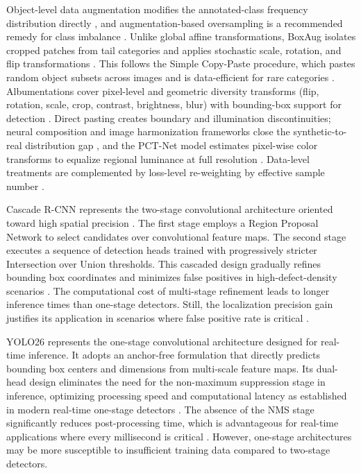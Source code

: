 \documentclass[pdflatex,sn-basic,Numbered,iicol]{sn-jnl}
\begin{document}
Object-level data augmentation modifies the annotated-class frequency distribution directly \citep{LEE2022104138}, and augmentation-based oversampling is a recommended remedy for class imbalance \citep{shorten2019augmentation}. Unlike global affine transformations, BoxAug isolates cropped patches from tail categories and applies stochastic scale, rotation, and flip transformations \citep{LEE2022104138}. This follows the Simple Copy-Paste procedure, which pastes random object subsets across images and is data-efficient for rare categories \citep{ghiasi2021simple}. Albumentations cover pixel-level and geometric diversity transforms (flip, rotation, scale, crop, contrast, brightness, blur) with bounding-box support for detection \citep{buslaev2020albumentations}. Direct pasting creates boundary and illumination discontinuities; neural composition and image harmonization frameworks close the synthetic-to-real distribution gap \citep{cong2021bargainnet}, and the PCT-Net model estimates pixel-wise color transforms to equalize regional luminance at full resolution \citep{Guerreiro_2023_CVPR}. Data-level treatments are complemented by loss-level re-weighting by effective sample number \citep{cui2019classbalanced}.

Cascade R-CNN represents the two-stage convolutional architecture oriented toward high spatial precision \citep{cai2018cascade}. The first stage employs a Region Proposal Network to select candidates over convolutional feature maps. The second stage executes a sequence of detection heads trained with progressively stricter Intersection over Union thresholds. This cascaded design gradually refines bounding box coordinates and minimizes false positives in high-defect-density scenarios \citep{cai2018cascade}. The computational cost of multi-stage refinement leads to longer inference times than one-stage detectors. Still, the localization precision gain justifies its application in scenarios where false positive rate is critical \citep{cai2018cascade}.

YOLO26 represents the one-stage convolutional architecture designed for real-time inference. It adopts an anchor-free formulation that directly predicts bounding box centers and dimensions from multi-scale feature maps. Its dual-head design eliminates the need for the non-maximum suppression stage in inference, optimizing processing speed and computational latency as established in modern real-time one-stage detectors \citep{wang2024yolov10}. The absence of the NMS stage significantly reduces post-processing time, which is advantageous for real-time applications where every millisecond is critical \citep{wang2024yolov10}. However, one-stage architectures may be more susceptible to insufficient training data compared to two-stage detectors.
\end{document}

